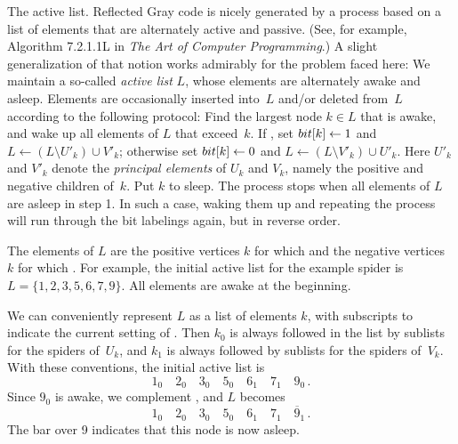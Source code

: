 The active list. Reflected Gray code is nicely generated by a process
based on a list of elements that are alternately active and passive.
(See, for example, Algorithm 7.2.1.1L in {\sl The Art of Computer
Programming}.) A slight generalization of that notion works admirably for the
problem faced here: We maintain a so-called {\it active list\/} $L$, whose
elements are alternately awake and asleep. Elements are occasionally inserted
into~$L$ and/or deleted from~$L$ according to the following protocol:
\smallskip
{} Find the largest node $k\in L$ that is awake, and wake up
all elements of $L$ that exceed~$k$.
 If , set $\relax{\\{bit}}[k]\gets1$ and
$L\gets(L\setminus U'_k)\cup V'_k$; otherwise set $\relax{\\{bit}}[k]\gets0$ and
$L\gets(L\setminus V'_k)\cup U'_k$. Here $U'_k$ and $V'_k$ denote the
{\it principal elements\/} of $U_k$ and $V_k$, namely the positive
and negative children of~$k$.
 Put $k$ to sleep.
\smallskip\noindent
The process stops when all elements of $L$ are asleep in step 1. In such a
case, waking them up and repeating the process will run through the
bit labelings again, but in reverse order.

The elements of $L$ are the positive vertices $k$ for which 
and the negative vertices $k$ for which .
For example, the initial active list for the example spider
is $L=\{1,2,3,5,6,7,9\}$. All elements are awake at the beginning.

\def\p#1{\overline#1}
We can conveniently represent $L$ as a list of elements $k$, with
subscripts to indicate the current setting of . Then $k_0$ is
always followed in the list by sublists for the spiders of~$U_k$, and
$k_1$ is always followed by sublists for the spiders of~$V_k$. With
these conventions, the initial active list is
$$1_0\quad 2_0\quad 3_0\quad 5_0\quad 6_1\quad 7_1\quad 9_0\,.$$
Since $9_0$ is awake, we complement , and $L$ becomes
$$1_0\quad 2_0\quad 3_0\quad 5_0\quad 6_1\quad 7_1\quad \p9_1\,.$$
The bar over 9 indicates that this node is now asleep.

